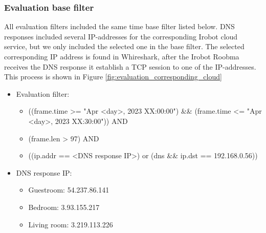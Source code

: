 \subsubsection{Evaluation base filter}
All evaluation filters included the same time base filter listed below. DNS responses included several IP-addresses for the corresponding Irobot cloud service, but we only included the selected one in the base filter. The selected corresponding IP address is found in Whireshark, after the Irobot Roobma receives the DNS response it establish a TCP session to one of the IP-addresses. This process is shown in Figure \ref{fig:evaluation_corresponding_cloud}


\begin{itemize}
    \item Evaluation filter: \begin{itemize}
                                \item ((frame.time >= "Apr <day>, 2023 XX:00:00") \&\& (frame.time <= "Apr <day>, 2023 XX:30:00")) AND
                                \item (frame.len > 97) AND 
                                \item  ((ip.addr == <DNS response IP>) or (dns \&\& ip.dst == 192.168.0.56))
                            \end{itemize}
    \item DNS response IP:  \begin{itemize}
                                \item Guestroom: 54.237.86.141 
                                \item Bedroom: 3.93.155.217 
                                \item Living room: 3.219.113.226 
                            \end{itemize}
\end{itemize}

